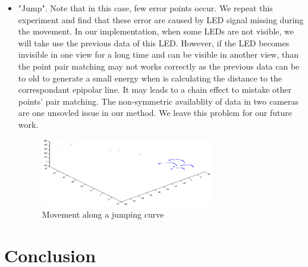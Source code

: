 \documentclass[10pt,twocolumn,letterpaper]{article}
\begin{document}
\begin{itemize}
\item "Jump". Note that in this case, few error points occur. We repeat this experiment and find that these error are caused by LED signal missing during the movement. In our implementation, when some LEDs are not visible, we will take use the previous data of this LED. However, if the LED becomes invisible in one view for a long time and can be visible in another view, than the point pair matching may not works correctly as the previous data can be to old to generate a small energy when is calculating the distance to the correspondant epipolar line. It may leads to a chain effect to mistake other points' pair matching. The non-symmetric availablity of data in two cameras are one unsovled issue in our method. We leave this problem for our future work.

\begin{figure}
\centering
\includegraphics[width=7.5cm]{jump.eps}
\caption{Movement along a jumping curve}
\label{jump}
\end{figure}
\end{itemize}

\section{Conclusion}


{\small


}

\end{document}
